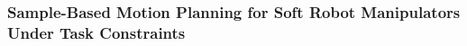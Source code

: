 
\subsubsection{Sample-Based Motion Planning for Soft Robot Manipulators
Under Task Constraints} 
\label{sec:SampleBasedMotionPlanningSoftRobots}